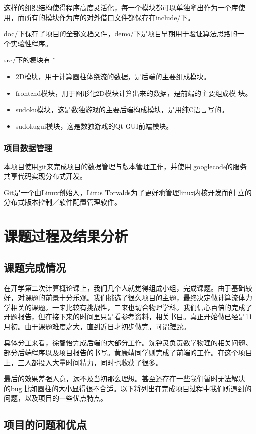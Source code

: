 \documentclass[12pt]{article}
\begin{document}
这样的组织结构使得程序高度灵活化，每一个模块都可以单独拿出作为一个库使
用，而所有的模块作为库的对外借口文件都保存在include/下。

doc/下保存了项目的全部文档文件，demo/下是项目早期用于验证算法思路的一
个实验性程序。

src/下的模块有：
\begin{itemize}
\item 2D模块，用于计算圆柱体绕流的数据，是后端的主要组成模块。
\item frontend模块，用于图形化2D模块计算出来的数据，是前端的主要组成模
  块。
\item sudoku模块，这是数独游戏的主要后端构成模块，是用纯C语言写的。
\item sudokugui模块，这是数独游戏的Qt GUI前端模块。
\end{itemize}

\subsubsection{项目数据管理}

本项目使用git\cite{git}来完成项目的数据管理与版本管理工作，并使用
googlecode的服务共享代码实现分布式开发。

Git是一个由Linux创始人，Linus Torvalds为了更好地管理linux内核开发而创
立的分布式版本控制／软件配置管理软件。


\section{课题过程及结果分析}
\subsection{课题完成情况}
在开学第二次计算概论课上，我们几个人就觉得组成小组，完成课题。由于基础较好，对课题的前景十分乐观。我们挑选了很久项目的主题，最终决定做计算流体力学相关的课题。一来比较有挑战性，二来也切合物理学科。我们信心百倍的完成了开题报告，但在接下来的时间里只是看参考资料，相关书目。真正开始做已经是11月初。由于课题难度之大，直到近日才初步做完，可谓蹉跎。

具体分工来看，徐智怡完成后端的大部分工作。沈钟灵负责数学物理的相关问题、部分后端程序以及项目报告的书写。黄康靖同学则完成了前端的工作。在这个项目上，三人都投入大量时间精力，同时也收获了很多。

最后的效果差强人意，远不及当初那么理想。甚至还存在一些我们暂时无法解决
的bug.比如圆柱的大小显得很不合适。以下将列出在完成项目过程中我们所遇到的问题，以及项目的一些优点特点。
\subsection{项目的问题和优点}
\end{document}
